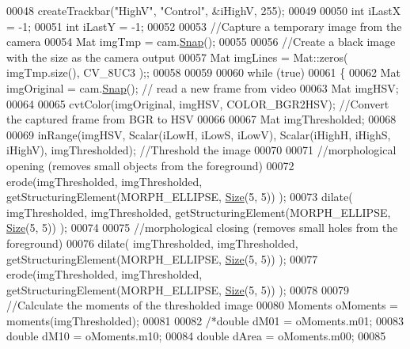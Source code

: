 \begin{DoxyCode}
00048         createTrackbar(\textcolor{stringliteral}{"HighV"}, \textcolor{stringliteral}{"Control"}, &iHighV, 255);
00049 
00050         \textcolor{keywordtype}{int} iLastX = -1; 
00051         \textcolor{keywordtype}{int} iLastY = -1;
00052 
00053         \textcolor{comment}{//Capture a temporary image from the camera}
00054         Mat imgTmp = cam.\hyperlink{classChipChipArray_1_1PiCamera_a58fb0de02570dce9a9cb60a1a04fb84f}{Snap}();
00055 
00056         \textcolor{comment}{//Create a black image with the size as the camera output}
00057         Mat imgLines = Mat::zeros( imgTmp.size(), CV\_8UC3 );;
00058 
00059 
00060         \textcolor{keywordflow}{while} (\textcolor{keyword}{true})
00061         \{
00062             Mat imgOriginal = cam.\hyperlink{classChipChipArray_1_1PiCamera_a58fb0de02570dce9a9cb60a1a04fb84f}{Snap}(); \textcolor{comment}{// read a new frame from video}
00063             Mat imgHSV;
00064 
00065             cvtColor(imgOriginal, imgHSV, COLOR\_BGR2HSV); \textcolor{comment}{//Convert the captured frame from BGR to HSV}
00066 
00067             Mat imgThresholded;
00068 
00069             inRange(imgHSV, Scalar(iLowH, iLowS, iLowV), Scalar(iHighH, iHighS, iHighV), imgThresholded); \textcolor{comment}{
      //Threshold the image}
00070 
00071             \textcolor{comment}{//morphological opening (removes small objects from the foreground)}
00072             erode(imgThresholded, imgThresholded, getStructuringElement(MORPH\_ELLIPSE, 
      \hyperlink{definitions_8hpp_a9809446fd16a744b6df9808293f14153}{Size}(5, 5)) );
00073             dilate( imgThresholded, imgThresholded, getStructuringElement(MORPH\_ELLIPSE, 
      \hyperlink{definitions_8hpp_a9809446fd16a744b6df9808293f14153}{Size}(5, 5)) ); 
00074 
00075             \textcolor{comment}{//morphological closing (removes small holes from the foreground)}
00076             dilate( imgThresholded, imgThresholded, getStructuringElement(MORPH\_ELLIPSE, 
      \hyperlink{definitions_8hpp_a9809446fd16a744b6df9808293f14153}{Size}(5, 5)) ); 
00077             erode(imgThresholded, imgThresholded, getStructuringElement(MORPH\_ELLIPSE, 
      \hyperlink{definitions_8hpp_a9809446fd16a744b6df9808293f14153}{Size}(5, 5)) );
00078 
00079             \textcolor{comment}{//Calculate the moments of the thresholded image}
00080             Moments oMoments = moments(imgThresholded);
00081 
00082             \textcolor{comment}{/*double dM01 = oMoments.m01;}
00083 \textcolor{comment}{              double dM10 = oMoments.m10;}
00084 \textcolor{comment}{              double dArea = oMoments.m00;}
00085 \textcolor{comment}{}

\end{DoxyCode}
